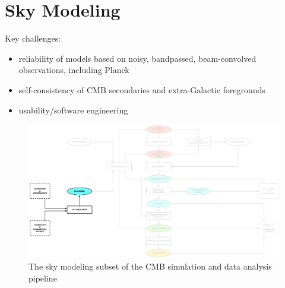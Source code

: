 
\section{Sky Modeling}

Key challenges: 
\begin{itemize} 
\item reliability of models based on noisy, bandpassed, beam-convolved observations, including Planck
\item self-consistency of CMB secondaries and extra-Galactic foregrounds
\item usability/software engineering
\end{itemize} 

\begin{figure}[htbp]
\centering
\includegraphics[width=1\textwidth]{Analysis/sm}
\caption{The sky modeling subset of the CMB simulation and data analysis pipeline}
\label{default}

\end{figure}

%



